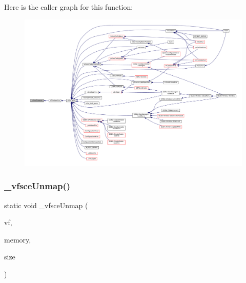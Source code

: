 Here is the caller graph for this function\+:
\nopagebreak
\begin{figure}[H]
\begin{center}
\leavevmode
\includegraphics[width=350pt]{sce-vfs_8c_a2d93895f44e1589f7f3e3a2aa6850b08_icgraph}
\end{center}
\end{figure}
\mbox{\label{sce-vfs_8c_a294309dc9bd8e8bd80780494cb15e4a4}} 
\subsubsection{\texorpdfstring{\+\_\+vfsce\+Unmap()}{\_vfsceUnmap()}}
{\footnotesize\ttfamily static void \+\_\+vfsce\+Unmap (\begin{DoxyParamCaption}\item[{struct V\+File $\ast$}]{vf,  }\item[{void $\ast$}]{memory,  }\item[{size\+\_\+t}]{size }\end{DoxyParamCaption})\hspace{0.3cm}{\ttfamily [static]}}


